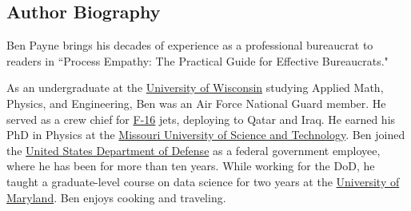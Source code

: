 \begin{center}
\section*{Author Biography}
\end{center}

Ben Payne brings his decades of experience as a professional bureaucrat to readers in ``Process Empathy: The Practical Guide for Effective Bureaucrats."

As an undergraduate at the 
\href{https://en.wikipedia.org/wiki/University_of_Wisconsin\%E2\%80\%93Madison}{University of Wisconsin} studying 
Applied Math, Physics, and Engineering, 
Ben was an Air Force National Guard member. He served as a crew chief for 
\href{https://en.wikipedia.org/wiki/General_Dynamics_F-16_Fighting_Falcon}{F-16} jets, deploying to Qatar and Iraq.
He earned his PhD in Physics at the 
\href{https://en.wikipedia.org/wiki/Missouri_University_of_Science_and_Technology}{Missouri University of Science and Technology}. Ben joined the 
\href{https://en.wikipedia.org/wiki/United_States_Department_of_Defense}{United States Department of Defense} as a federal government employee, where he has been for more than ten years. While working for the DoD, he taught a graduate-level course on data science for two years at the 
\href{https://en.wikipedia.org/wiki/University_of_Maryland,_Baltimore_County}{University of Maryland}. Ben enjoys cooking and traveling. 

